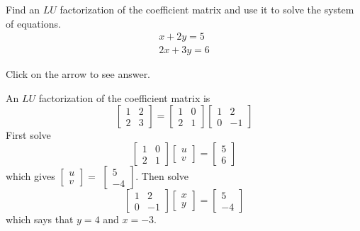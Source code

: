 \documentclass{ximera}
\begin{document}
\begin{problem}\label{prb:4.70} Find an $LU$ factorization of the coefficient matrix and use it to solve the system of equations.
\begin{equation*}
\begin{array}{c}
x+2y=5 \\
2x+3y=6
\end{array}
\end{equation*}

Click on the arrow to see answer.
\begin{expandable}{}{}
An $LU$ factorization of the coefficient matrix is
\[
\left[
\begin{array}{cc}
1 & 2 \\
2 & 3
\end{array}
\right] =  \left[
\begin{array}{cc}
1 & 0 \\
2 & 1
\end{array}
\right] \left[
\begin{array}{cc}
1 & 2 \\
0 & -1
\end{array}
\right]
\]
First solve
\[
\left[
\begin{array}{cc}
1 & 0 \\
2 & 1
\end{array}
\right] \left[
\begin{array}{c}
u \\
v
\end{array}
\right] =\left[
\begin{array}{c}
5 \\
6
\end{array}
\right]
\]
which gives $\left[
\begin{array}{c}
u \\
v
\end{array}
\right] =$ $\left[
\begin{array}{r}
5 \\
-4
\end{array}
\right] .$ Then solve
\[
\left[
\begin{array}{rr}
1 & 2 \\
0 & -1
\end{array}
\right] \left[
\begin{array}{c}
x \\
y
\end{array}
\right] =\left[
\begin{array}{r}
5 \\
-4
\end{array}
\right]
\]
which says that $y=4$ and $x=-3.$
\end{expandable}
\end{problem}
\end{document}
